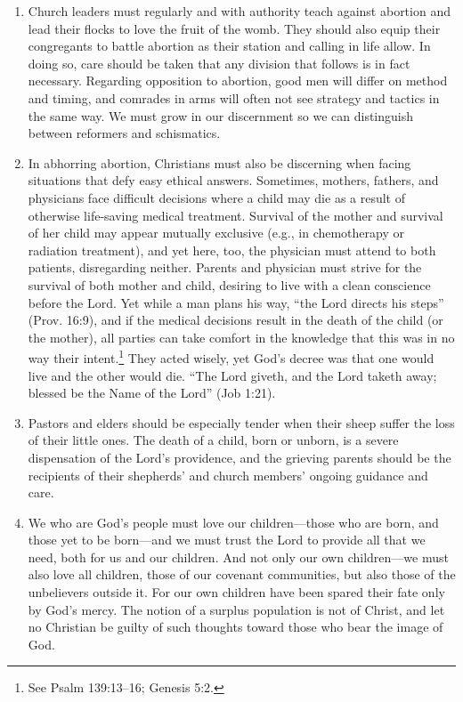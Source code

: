 \documentclass[
]{book}
\begin{document}
\begin{enumerate}
\item
  Church leaders must regularly and with authority teach against abortion and lead their flocks to love the fruit of the womb. They should also equip their congregants to battle abortion as their station and calling in life allow. In doing so, care should be taken that any division that follows is in fact necessary. Regarding opposition to abortion, good men will differ on method and timing, and comrades in arms will often not see strategy and tactics in the same way. We must grow in our discernment so we can distinguish between reformers and schismatics.
\item
  In abhorring abortion, Christians must also be discerning when facing situations that defy easy ethical answers. Sometimes, mothers, fathers, and physicians face difficult decisions where a child may die as a result of otherwise life-saving medical treatment. Survival of the mother and survival of her child may appear mutually exclusive (e.g., in chemotherapy or radiation treatment), and yet here, too, the physician must attend to both patients, disregarding neither. Parents and physician must strive for the survival of both mother and child, desiring to live with a clean conscience before the Lord. Yet while a man plans his way, ``the Lord directs his steps'' (Prov. 16:9), and if the medical decisions result in the death of the child (or the mother), all parties can take comfort in the knowledge that this was in no way their intent.\footnote{See Psalm 139:13--16; Genesis 5:2.} They acted wisely, yet God's decree was that one would live and the other would die. ``The Lord giveth, and the Lord taketh away; blessed be the Name of the Lord'' (Job 1:21).
\item
  Pastors and elders should be especially tender when their sheep suffer the loss of their little ones. The death of a child, born or unborn, is a severe dispensation of the Lord's providence, and the grieving parents should be the recipients of their shepherds' and church members' ongoing guidance and care.
\item
  We who are God's people must love our children---those who are born, and those yet to be born---and we must trust the Lord to provide all that we need, both for us and our children. And not only our own children---we must also love all children, those of our covenant communities, but also those of the unbelievers outside it. For our own children have been spared their fate only by God's mercy. The notion of a surplus population is not of Christ, and let no Christian be guilty of such thoughts toward those who bear the image of God.

\end{enumerate}
\end{document}
